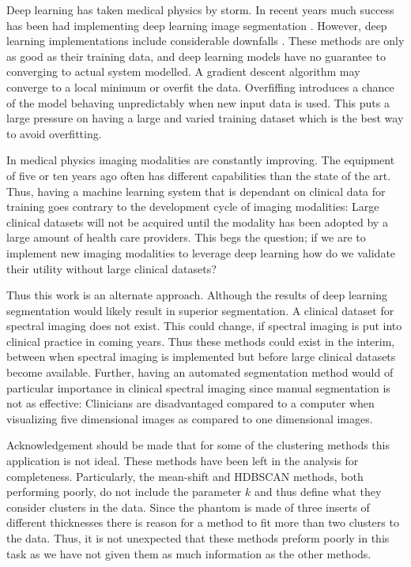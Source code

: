\documentclass[a4paper,11pt]{article}
\begin{document}
Deep learning has taken medical physics by storm. In recent years much success has been had implementing deep learning image segmentation \cite{IsenseeNnU-Net:Segmentation,Ronneberger2015U-Net:Segmentation}. However, deep learning implementations include considerable downfalls \cite{Marcus2018DeepAppraisal}. These methods are only as good as their training data, and deep learning models have no guarantee to converging to actual system modelled. A gradient descent algorithm may converge to a local minimum or overfit the data. Overfiffing introduces a chance of the model behaving unpredictably when new input data is used. This puts a large pressure on having a large and varied training dataset which is the best way to avoid overfitting.

In medical physics imaging modalities are constantly improving. The equipment of five or ten years ago often has different capabilities than the state of the art. Thus, having a machine learning system that is dependant on clinical data for training goes contrary to the development cycle of imaging modalities: Large clinical datasets will not be acquired until the modality has been adopted by a large amount of health care providers. This begs the question; if we are to implement new imaging modalities to leverage deep learning how do we validate their utility without large clinical datasets?

Thus this work is an alternate approach. Although the results of deep learning segmentation \cite{Ronneberger2015U-Net:Segmentation} would likely result in superior segmentation. A clinical dataset for spectral imaging does not exist. This could change, if spectral imaging is put into clinical practice in coming years. Thus these methods could exist in the interim, between when spectral imaging is implemented but before large clinical datasets become available. Further, having an automated segmentation method would of particular importance in clinical spectral imaging since manual segmentation is not as effective: Clinicians are disadvantaged compared to a computer when visualizing five dimensional images as compared to one dimensional images.

Acknowledgement should be made that for some of the clustering methods this application is not ideal. These methods have been left in the analysis for completeness. Particularly, the mean-shift and HDBSCAN methods, both performing poorly, do not include the parameter $k$ and thus define what they consider clusters in the data. Since the phantom is made of three inserts of different thicknesses there is reason for a method to fit more than two clusters to the data. Thus, it is not unexpected that these methods preform poorly in this task as we have not given them as much information as the other methods. 
\end{document}
